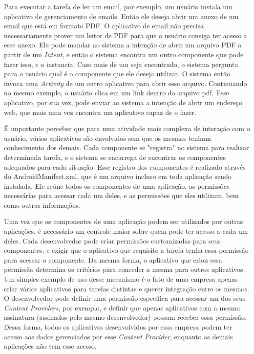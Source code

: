 Para executar a tarefa de ler um email, por exemplo, um usuário instala um aplicativo de gerenciamento de emails. Então ele deseja abrir um anexo de um email que está em formato PDF. O aplicativo de email não precisa necessariamente prover um leitor de PDF para que o usuário consiga ter acesso a esse anexo. Ele pode mandar ao sistema a intenção de abrir um arquivo PDF a partir de um \textit{Intent}, e então o sistema encontra um outro componente que pode fazer isso, e o instancia. Caso mais de um seja encontrado, o sistema pergunta para o usuário qual é o componente que ele deseja utilizar. O sistema então invoca uma \textit{Activity} de um outro aplicativo para abrir esse arquivo. Continuando no mesmo exemplo, o usuário clica em um link dentro do arquivo pdf. Esse aplicativo, por sua vez, pode enviar ao sistema a intenção de abrir um endereço web, que mais uma vez encontra um aplicativo capaz de o fazer.  

É importante perceber que para uma atividade mais complexa de interação com o usuário, vários aplicativos são envolvidos sem que os mesmos tenham conhecimento dos demais. Cada componente se "registra" no sistema para realizar determinada tarefa, e o sistema se encarrega de encontrar os componentes adequados para cada situação. Esse registro dos componentes é realizado através do AndroidManifest.xml, que é um arquivo incluso em toda aplicação sendo instalada. Ele reúne todos os componentes de uma aplicação, as permissões necessárias para acessar cada um deles, e as permissões que eles utilizam, bem como outras informações. 

Uma vez que os componentes de uma aplicação podem ser utilizados por outras aplicações, é necessário um controle maior sobre quem pode ter acesso a cada um deles. Cada desenvolvedor pode criar permissões customizadas para seus componentes, e exigir que o aplicativo que requisite a tarefa tenha essa permissão para acessar o componente. Da mesma forma, o aplicativo que criou essa permissão determina os critérios para conceder a mesma para outros aplicativos. Um simples exemplo de uso desse mecanismo é o fato de uma empresa apenas criar vários aplicativos para tarefas distintas e querer integração entre os mesmos. O desenvolvedor pode definir uma permissão específica para acessar um dos seus \textit{Content Providers}, por exemplo, e definir que apenas aplicativos com a mesma assinatura (assinados pelo mesmo desenvolvedor) possam receber essa permissão. Dessa forma, todos os aplicativos desenvolvidos por essa empresa podem ter acesso aos dados gerenciados por esse \textit{Content Provider}, enquanto as demais aplicações não tem esse acesso. 

